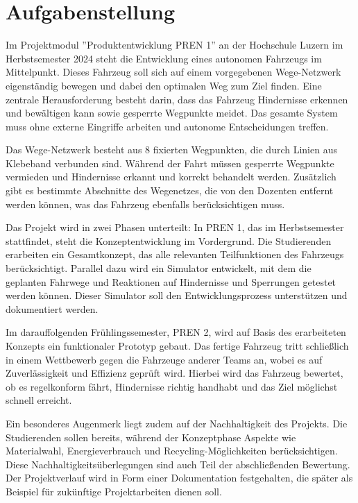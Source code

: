 \newpage
\section{Aufgabenstellung}
Im Projektmodul ''Produktentwicklung PREN 1'' an der Hochschule Luzern im Herbstsemester 2024 steht die Entwicklung eines autonomen Fahrzeugs im Mittelpunkt. Dieses Fahrzeug soll sich auf einem vorgegebenen Wege-Netzwerk eigenständig bewegen und dabei den optimalen Weg zum Ziel finden. Eine zentrale Herausforderung besteht darin, dass das Fahrzeug Hindernisse erkennen und bewältigen kann sowie gesperrte Wegpunkte meidet. Das gesamte System muss ohne externe Eingriffe arbeiten und autonome Entscheidungen treffen. 

Das Wege-Netzwerk besteht aus 8 fixierten Wegpunkten, die durch Linien aus Klebeband verbunden sind. Während der Fahrt müssen gesperrte Wegpunkte vermieden und Hindernisse erkannt und korrekt behandelt werden. Zusätzlich gibt es bestimmte Abschnitte des Wegenetzes, die von den Dozenten entfernt werden können, was das Fahrzeug ebenfalls berücksichtigen muss. 

Das Projekt wird in zwei Phasen unterteilt: In PREN 1, das im Herbstsemester stattfindet, steht die Konzeptentwicklung im Vordergrund. Die Studierenden erarbeiten ein Gesamtkonzept, das alle relevanten Teilfunktionen des Fahrzeugs berücksichtigt. Parallel dazu wird ein Simulator entwickelt, mit dem die geplanten Fahrwege und Reaktionen auf Hindernisse und Sperrungen getestet werden können. Dieser Simulator soll den Entwicklungsprozess unterstützen und dokumentiert werden. 

Im darauffolgenden Frühlingssemester, PREN 2, wird auf Basis des erarbeiteten Konzepts ein funktionaler Prototyp gebaut. Das fertige Fahrzeug tritt schließlich in einem Wettbewerb gegen die Fahrzeuge anderer Teams an, wobei es auf Zuverlässigkeit und Effizienz geprüft wird. Hierbei wird das Fahrzeug bewertet, ob es regelkonform fährt, Hindernisse richtig handhabt und das Ziel möglichst schnell erreicht. 

Ein besonderes Augenmerk liegt zudem auf der Nachhaltigkeit des Projekts. Die Studierenden sollen bereits, während der Konzeptphase Aspekte wie Materialwahl, Energieverbrauch und Recycling-Möglichkeiten berücksichtigen. Diese Nachhaltigkeitsüberlegungen sind auch Teil der abschließenden Bewertung. Der Projektverlauf wird in Form einer Dokumentation festgehalten, die später als Beispiel für zukünftige Projektarbeiten dienen soll.

